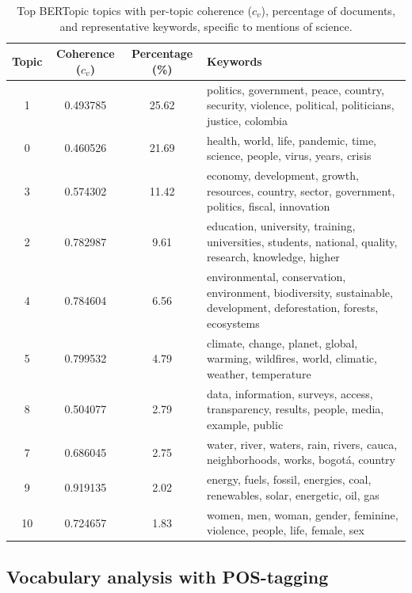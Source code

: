 \documentclass[11pt,a4paper]{article}
\begin{document}
		\begin{table}[H]
			\centering
			\small
			\caption{Top BERTopic topics with per-topic coherence ($c_v$), percentage of documents, and representative keywords, specific to mentions of science.}
			\begin{tabularx}{\textwidth}{c c c X}
				\hline
				\textbf{Topic} & \textbf{Coherence ($c_v$)} & \textbf{Percentage (\%)} & \textbf{Keywords} \\
				\hline
				1  & 0.493785 & 25.62 & politics, government, peace, country, security, violence, political, politicians, justice, colombia \\
				0  & 0.460526 & 21.69 & health, world, life, pandemic, time, science, people, virus, years, crisis \\
				3  & 0.574302 & 11.42 & economy, development, growth, resources, country, sector, government, politics, fiscal, innovation \\
				2  & 0.782987 & 9.61  & education, university, training, universities, students, national, quality, research, knowledge, higher \\
				4  & 0.784604 & 6.56  & environmental, conservation, environment, biodiversity, sustainable, development, deforestation, forests, ecosystems \\
				5  & 0.799532 & 4.79  & climate, change, planet, global, warming, wildfires, world, climatic, weather, temperature \\
				8  & 0.504077 & 2.79  & data, information, surveys, access, transparency, results, people, media, example, public \\
				7  & 0.686045 & 2.75  & water, river, waters, rain, rivers, cauca, neighborhoods, works, bogotá, country \\
				9  & 0.919135 & 2.02  & energy, fuels, fossil, energies, coal, renewables, solar, energetic, oil, gas \\
				10 & 0.724657 & 1.83  & women, men, woman, gender, feminine, violence, people, life, female, sex \\
				\hline
			\end{tabularx}
		
			\label{tab:topics_ciencia}
		\end{table}
		
		
		
\subsection{Vocabulary analysis with POS-tagging}
\end{document}
